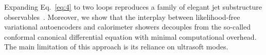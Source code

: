 Expanding Eq.~\eqref{eq:4} to two loops reproduces a family of elegant
jet substructure
observables~\cite{TPC:1069-VALUATION-Vector-Like-All-Order-Logarithmic-Unresolved-Asymptotic-Transformer-Based-Interpretable-One-Loop-Networks-September-22-2026}.
Moreover, we show that the interplay between likelihood-free variational
autoencoders and calorimeter showers decouples from the so-called
conformal canonical differential equation with minimal computational
overhead. The main limitation of this approach is its reliance on
ultrasoft modes.

